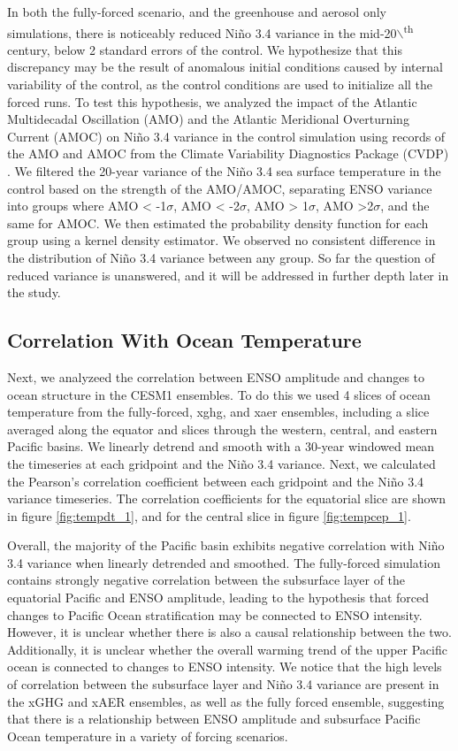 \documentclass[12pt]{article}
\begin{document}
In both the fully-forced scenario, and the greenhouse and aerosol only simulations, there is noticeably reduced Niño 3.4 variance in the mid-20$\backslash$\textsuperscript{th} century, below 2 standard errors of the control. We hypothesize that this discrepancy may be the result of anomalous initial conditions caused by internal variability of the control, as the control conditions are used to initialize all the forced runs. To test this hypothesis, we analyzed the impact of the Atlantic Multidecadal Oscillation (AMO) and the Atlantic Meridional Overturning Current (AMOC) on Niño 3.4 variance in the control simulation using records of the AMO and AMOC from the Climate Variability Diagnostics Package (CVDP) \parencite{phillips2014evaluating}. We filtered the 20-year variance of the Niño 3.4 sea surface temperature in the control based on the strength of the AMO/AMOC, separating ENSO variance into groups where AMO < -1\(\sigma\), AMO < -2\(\sigma\), AMO > 1\(\sigma\), AMO >2\(\sigma\), and the same for AMOC. We then estimated the probability density function for each group using a kernel density estimator. We observed no consistent difference in the distribution of Niño 3.4 variance between any group. So far the question of reduced variance is unanswered, and it will be addressed in further depth later in the study.

\subsection{Correlation With Ocean Temperature}
Next, we analyzeed the correlation between ENSO amplitude and changes to ocean structure in the CESM1 ensembles. To do this we used 4 slices of ocean temperature from the fully-forced, xghg, and xaer ensembles, including a slice averaged along the equator and slices through the western, central, and eastern Pacific basins. We linearly detrend and smooth with a 30-year windowed mean the timeseries at each gridpoint and the Niño 3.4 variance. Next, we calculated the Pearson's correlation coefficient between each gridpoint and the Niño 3.4 variance timeseries. The correlation coefficients for the equatorial slice are shown in figure \ref{fig:tempdt_1}, and for the central slice in figure \ref{fig:tempcep_1}.

Overall, the majority of the Pacific basin exhibits negative correlation with Niño 3.4 variance when linearly detrended and smoothed. The fully-forced simulation contains strongly negative correlation between the subsurface layer of the equatorial Pacific and ENSO amplitude, leading to the hypothesis that forced changes to Pacific Ocean stratification may be connected to ENSO intensity. However, it is unclear whether there is also a causal relationship between the two. Additionally, it is unclear whether the overall warming trend of the upper Pacific ocean is connected to changes to ENSO intensity. We notice that the high levels of correlation between the subsurface layer and Niño 3.4 variance are present in the xGHG and xAER ensembles, as well as the fully forced ensemble, suggesting that there is a relationship between ENSO amplitude and subsurface Pacific Ocean temperature in a variety of forcing scenarios.
\end{document}
